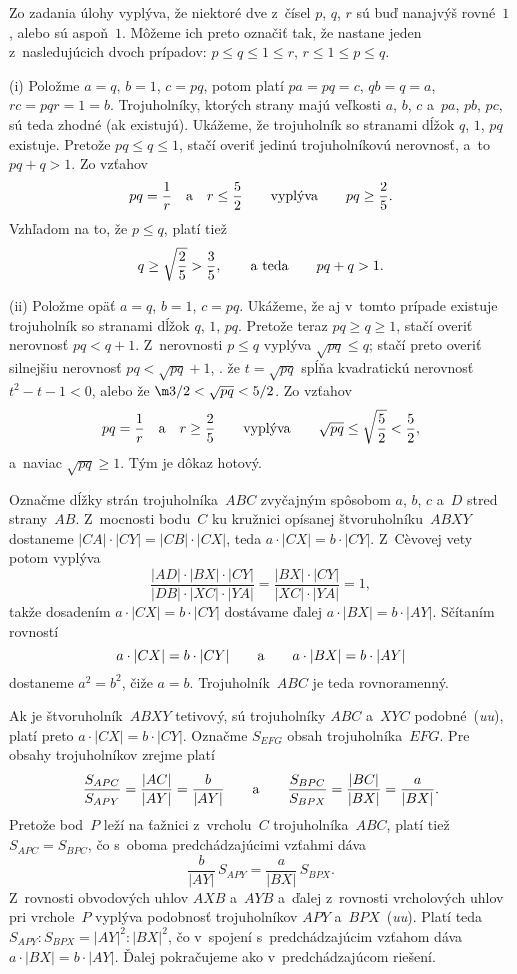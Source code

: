 {%
Zo zadania úlohy vyplýva, že niektoré dve z~čísel $p$, $q$, $r$ sú
buď nanajvýš rovné~$1$, alebo sú aspoň~$1$. Môžeme ich preto
označiť tak, že nastane jeden z~nasledujúcich dvoch prípadov:
 $p\leq q\leq 1\leq r$,
 $r\leq 1\leq p\leq q$.

\smallskip
(i) Položme $a=q$, $b=1$, $c=pq$, potom platí $pa=pq=c$,
$qb=q=a$, $rc=pqr=1=b$. Trojuholníky, ktorých strany majú
veľkosti $a$, $b$, $c$ a~$pa$, $pb$, $pc$, sú teda zhodné
(ak existujú). Ukážeme, že trojuholník so stranami dĺžok $q$,
$1$, $pq$ existuje. Pretože $pq\leq q\leq 1$, stačí overiť
jedinú trojuholníkovú nerovnosť, a~to $pq+q>1$. Zo vzťahov
$$
pq=\frac1{r} \quad \hbox{a} \quad r\leq \frac52 \qquad
         \hbox{vyplýva} \qquad pq\geq \frac25.
$$
   Vzhľadom na to, že $p\leq q$, platí tiež
$$
q\geq \sqrt{\frac25}>\frac35,\qquad \hbox{a teda} \qquad
      pq+q>1.
$$

\smallskip
(ii) Položme opäť $a=q$, $b=1$, $c=pq$. Ukážeme, že aj v~tomto
prípade existuje trojuholník so stranami dĺžok $q$, $1$, $pq$.
Pretože teraz $pq\geq q\geq 1$, stačí overiť nerovnosť $pq<q+1$.
Z~nerovnosti $p\leq q$ vyplýva $\sqrt{pq}\leq q$; stačí preto
overiť silnejšiu nerovnosť $pq<\sqrt{pq}+1$, \tj. že $t=\sqrt{pq}$
spĺňa kvadratickú nerovnosť $t^2-t-1<0$, alebo že
$\m3/2<\sqrt{pq}<5/2$.
Zo vzťahov
$$
\postdisplaypenalty 10000
pq=\frac1{r} \quad \hbox{a} \quad r\geq \frac25 \qquad
         \hbox{vyplýva} \qquad \sqrt{pq}\leq \sqrt{\frac52}<\frac52,
$$
a~naviac $\sqrt{pq}\geq 1$.
Tým je dôkaz hotový.}

{%
Označme dĺžky strán trojuholníka~$ABC$ zvyčajným spôsobom $a$,
$b$, $c$ a~$D$ stred strany~$AB$. Z~mocnosti bodu~$C$ ku
kružnici opísanej štvoruholníku~$ABXY$ dostaneme $|CA|\cdot
|CY|=|CB|\cdot |CX|$, teda $a\cdot |CX|=b\cdot |CY|$. Z~C\`evovej
vety potom vyplýva
$$
\frac{|AD|\cdot |BX|\cdot |CY|}{|DB|\cdot |XC|\cdot |YA|}=
\frac{|BX|\cdot |CY|}{|XC|\cdot |YA|}=1,
$$
takže dosadením $a\cdot |CX|=b\cdot |CY|$ dostávame ďalej
$a\cdot |BX|=b\cdot |AY|$. Sčítaním rovností
$$
a\cdot |CX|=b\cdot |CY|
\qquad \hbox{a}\qquad
a\cdot |BX|=b\cdot |AY|
$$
dostaneme $a^2=b^2$, čiže $a=b$. Trojuholník~$ABC$ je teda
rovnoramenný.

\ineriesenie
Ak je štvoruholník~$ABXY$ tetivový, sú
trojuholníky $ABC$ a~$XYC$ podobné~({\it uu\/}), platí preto
$a\cdot |CX|=b\cdot|CY|$.
Označme $S_{EFG}$ obsah trojuholníka~$EFG$.
Pre obsahy trojuholníkov zrejme platí
$$
\frac{S_{APC}}{S_{APY}}=\frac{|AC|}{|AY|}=\frac{b}{|AY|}\qquad \hbox{a}
    \qquad \frac{S_{BPC}}{S_{BPX}}=\frac{|BC|}{|BX|}=\frac{a}{|BX|}.
$$
Pretože bod~$P$ leží na ťažnici z~vrcholu~$C$ trojuholníka~$ABC$,
platí tiež $S_{APC}=S_{BPC}$, čo s~oboma predchádzajúcimi
vzťahmi dáva
$$
\frac{b}{|AY|}\,S_{APY}=\frac{a}{|BX|}\,S_{BPX}.
$$
Z~rovnosti obvodových uhlov $AXB$ a~$AYB$ a~ďalej z~rovnosti
vrcholových uhlov pri vrchole~$P$ vyplýva podobnosť trojuholníkov
$APY$ a~$BPX$~({\it uu\/}). Platí teda
$S_{APY}:S_{BPX}=|AY|^2:|BX|^2$, čo v~spojení s~predchádzajúcim
vzťahom dáva $a\cdot |BX|=b\cdot |AY|$. Ďalej pokračujeme ako 
v~predchádzajúcom riešení.}

